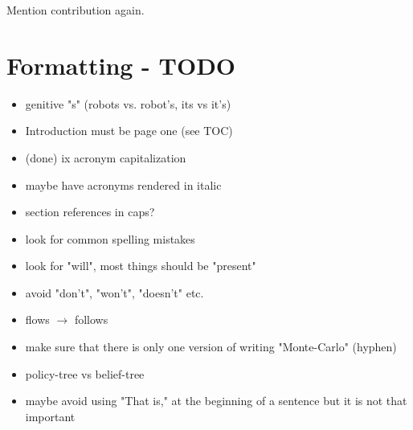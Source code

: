 

Mention contribution again.

\chapter{Formatting - TODO}

\begin{itemize}
  \item genitive "s" (robots vs. robot's, its vs it's) 
  \item Introduction must be page one (see TOC)
  \item (done) ix acronym capitalization
  \item maybe have acronyms rendered in italic
  \item section references in caps?
  \item look for common spelling mistakes
  \item look for "will", most things should be "present"
  \item avoid "don't", "won't", "doesn't" etc.\
  \item flows $\to$ follows
  \item make sure that there is only one version of writing "Monte-Carlo" (hyphen)
  \item policy-tree vs belief-tree
  \item maybe avoid using "That is," at the beginning of a sentence but it is not that important
\end{itemize}
